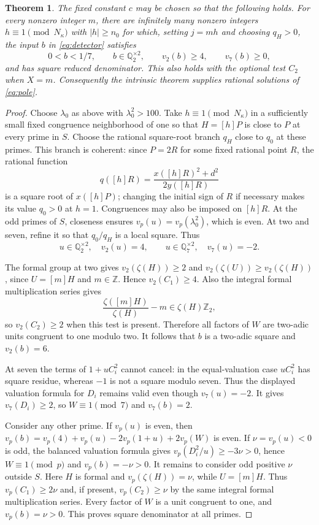 \documentclass[11pt,a4paper]{article}
\newtheorem{theorem}{Theorem}[section]
\newcommand{\Q}{\mathbb Q}\newcommand{\Z}{\mathbb Z}
\begin{document}
\begin{theorem}\label{thm:complete}
The fixed constant $c$ may be chosen so that the following holds.
For every nonzero integer $m$, there are infinitely many nonzero
integers $h\equiv1\pmod{N_\kappa}$ with $|h|\ge n_0$ for which,
setting $j=mh$ and
choosing $q_H>0$, the input $b$ in \eqref{eq:detector} satisfies
\[
 0<b<1/7,\qquad b\in\Q_2^{\times2},\qquad v_2(b)\ge4,
 \qquad v_7(b)\ge0,
\]
and has square reduced denominator. This also holds with the
optional test $C_2$ when $X=m$. Consequently the intrinsic
theorem supplies rational solutions of \eqref{eq:pole}.
\end{theorem}
\begin{proof}
Choose $\lambda_0$ as above with $\lambda_0^2>100$.
Take $h\equiv1\pmod{N_\kappa}$ in a sufficiently
small fixed congruence neighborhood of one so that $H=[h]P$
is close to $P$ at every prime in $S$. Choose the rational
square-root branch $q_H$ close to $q_0$ at these primes. This
branch is coherent: since $P=2R$ for some fixed rational point
$R$, the rational function
\[
        q([h]R)=\frac{x([h]R)^2+d^2}{2y([h]R)}
\]
is a square root of $x([h]P)$; changing the initial sign of $R$
if necessary makes its value $q_0>0$ at $h=1$. Congruences
may also be imposed on $[h]R$.
At the odd primes of $S$, closeness ensures
$v_p(u)=v_p(\lambda_0^2)$, which is even. At two and seven, refine it
so that $q_0/q_H$ is a local square. Thus
\[
 u\in\Q_2^{\times2},\quad v_2(u)=4,\qquad
 u\in\Q_7^{\times2},\quad v_7(u)=-2.
\]

The formal group at two gives $v_2(\zeta(H))\ge2$ and
$v_2(\zeta(U))\ge v_2(\zeta(H))$, since $U=[m]H$ and
$m\in\Z$. Hence $v_2(C_1)\ge4$. Also the integral formal
multiplication series gives
\[
       \frac{\zeta([m]H)}{\zeta(H)}-m
                      \in\zeta(H)\Z_2,
\]
so $v_2(C_2)\ge2$ when this test is present. Therefore all
factors of $W$ are two-adic units congruent to one modulo two.
It follows that $b$ is a two-adic square and $v_2(b)=6$.

At seven the terms of $1+uC_i^2$ cannot cancel: in the
equal-valuation case $uC_i^2$ has square residue, whereas
$-1$ is not a square modulo seven. Thus the displayed valuation
formula for $D_i$ remains valid even though $v_7(u)=-2$.
It gives $v_7(D_i)\ge2$, so $W\equiv1\pmod7$ and $v_7(b)=2$.

Consider any other prime. If $v_p(u)$ is even, then
$v_p(b)=v_p(4)+v_p(u)-2v_p(1+u)+2v_p(W)$ is even.
If $\nu=v_p(u)<0$ is odd, the balanced valuation formula gives
$v_p(D_i^2/u)\ge-3\nu>0$, hence $W\equiv1\pmod p$ and
$v_p(b)=-\nu>0$.
It remains to consider odd positive $\nu$ outside $S$.
Here $H$ is formal and $v_p(\zeta(H))=\nu$, while $U=[m]H$.
Thus $v_p(C_1)\ge2\nu$ and, if present,
$v_p(C_2)\ge\nu$ by the same integral formal multiplication
series. Every factor of $W$ is a unit congruent to one, and
$v_p(b)=\nu>0$. This proves square denominator at all primes.


\end{proof}
\end{document}
